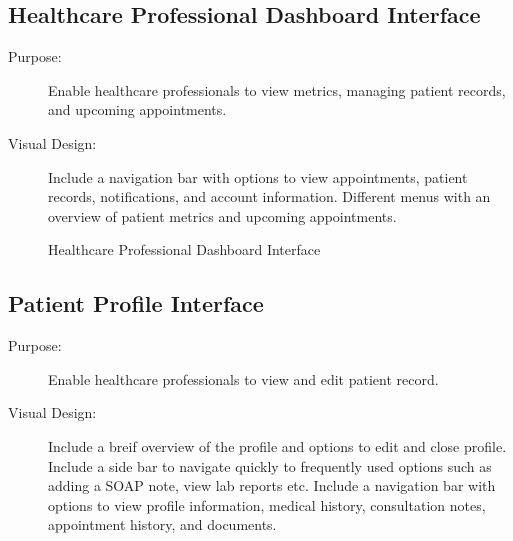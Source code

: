 \documentclass[12pt, titlepage]{article}
\begin{document}
\newpage{}

\subsection{Healthcare Professional Dashboard Interface}
\begin{description}
    \item[Purpose:]Enable healthcare professionals to view metrics, managing patient records, and upcoming appointments.

    \item[Visual Design:]Include a navigation bar with options to view appointments, patient records, notifications, and account information. Different menus with an overview of patient metrics and upcoming appointments.
    
\end{description}

\begin{figure}[h!]
    \centering
    \caption{Healthcare Professional Dashboard Interface}
    \label{fig:healthcare-interface-1}
\end{figure}

\newpage{}


\subsection{Patient Profile Interface}
\begin{description}
    \item[Purpose:]Enable healthcare professionals to view and edit patient record.

    \item[Visual Design:]Include a breif overview of the profile and options to edit and close profile. Include a side bar to navigate quickly to frequently used options such as adding a SOAP note, view lab reports etc. Include a navigation bar with options to view profile information, medical history, consultation notes, appointment history, and documents.
    
\end{description}
\end{document}
